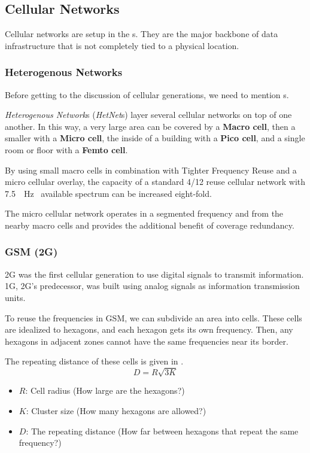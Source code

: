 \subsection{Cellular Networks}\label{subsec:Cell_Networks}
Cellular networks are setup in the s.
They are the major backbone of data infrastructure that is not completely tied to a physical location.

\subsubsection{Heterogenous Networks}\label{subsubsec:Heterogenous_Networks}
Before getting to the discussion of cellular generations, we need to mention s.

\begin{definition}\label{def:Heterogenous_Network}
  \emph{Heterogenous Network}s (\emph{HetNet}s) layer several cellular networks on top of one another.
  In this way, a very large area can be covered by a \textbf{Macro cell}, then a smaller with a \textbf{Micro cell}, the inside of a building with a \textbf{Pico cell}, and a single room or floor with a \textbf{Femto cell}.
\end{definition}

By using small macro cells in combination with Tighter Frequency Reuse and a micro cellular overlay, the capacity of a standard 4/12 reuse cellular network with \SI{7.5}{\mega{} \hertz{}} available spectrum can be increased eight-fold.

The micro cellular network operates in a segmented frequency and from the nearby macro cells and provides the additional benefit of coverage redundancy.

\subsubsection{GSM (2G)}\label{subsubsec:2G}
2G was the first cellular generation to use digital signals to transmit information.
1G, 2G's predecessor, was built using analog signals as information transmission units.

To reuse the frequencies in GSM, we can subdivide an area into cells.
These cells are idealized to hexagons, and each hexagon gets its own frequency.
Then, any hexagons in adjacent zones cannot have the same frequencies near its border.

The repeating distance of these cells is given in .
\begin{equation}\label{eq:GSM_Cell_Repeat_Distance}
  D = R \sqrt{3K}
\end{equation}
\begin{itemize}[noitemsep]
\item $R$: Cell radius (How large are the hexagons?)
\item $K$: Cluster size (How many hexagons are allowed?)
\item $D$: The repeating distance (How far between hexagons that repeat the same frequency?)
\end{itemize}

